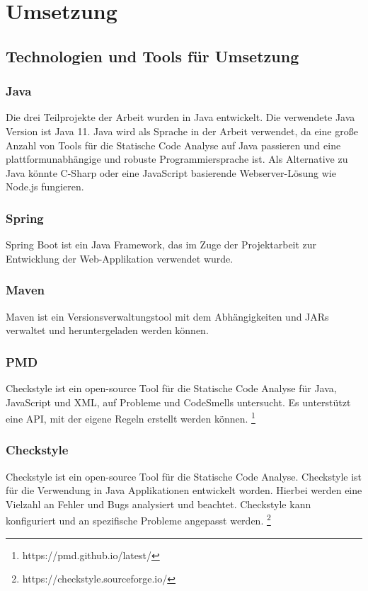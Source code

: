 
\chapter{Umsetzung}
\section{Technologien und Tools für Umsetzung } 

\subsection{Java} 
Die drei Teilprojekte der Arbeit wurden in Java entwickelt. Die verwendete Java Version ist Java 11. Java wird als Sprache in der Arbeit verwendet, da eine große Anzahl von Tools für die Statische Code Analyse auf Java passieren und eine plattformunabhängige und robuste Programmiersprache ist. Als Alternative zu Java könnte C-Sharp oder eine JavaScript basierende Webserver-Lösung wie Node.js fungieren.

\subsection{Spring} 
Spring Boot ist ein Java Framework, das im Zuge der Projektarbeit zur Entwicklung der Web-Applikation verwendet wurde.

\subsection{Maven} 
Maven ist ein Versionsverwaltungstool mit dem Abhängigkeiten und JARs verwaltet und heruntergeladen werden können.

\subsection{PMD} 
Checkstyle ist ein open-source Tool für die Statische Code Analyse für Java, JavaScript und XML, auf Probleme und CodeSmells untersucht. Es unterstützt eine API, mit der eigene Regeln erstellt werden können. \footnote{https://pmd.github.io/latest/}

\subsection{Checkstyle} 
Checkstyle ist ein open-source Tool für die Statische Code Analyse. Checkstyle ist für die Verwendung in Java Applikationen entwickelt worden. Hierbei werden eine Vielzahl an Fehler und Bugs analysiert und beachtet. Checkstyle kann konfiguriert und an spezifische Probleme angepasst werden. \footnote{https://checkstyle.sourceforge.io/}

